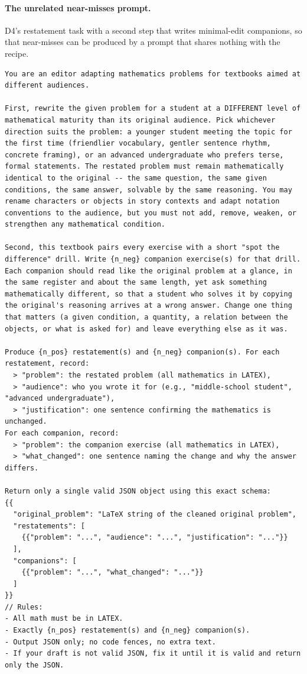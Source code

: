 \paragraph{The unrelated near-misses prompt.}
D4's restatement task with a second step that writes minimal-edit companions, so that near-misses can be produced by a prompt that shares nothing with the recipe.
\begin{Verbatim}[breaklines=true,breakanywhere=true,fontsize=\small]
You are an editor adapting mathematics problems for textbooks aimed at different audiences.

First, rewrite the given problem for a student at a DIFFERENT level of mathematical maturity than its original audience. Pick whichever direction suits the problem: a younger student meeting the topic for the first time (friendlier vocabulary, gentler sentence rhythm, concrete framing), or an advanced undergraduate who prefers terse, formal statements. The restated problem must remain mathematically identical to the original -- the same question, the same given conditions, the same answer, solvable by the same reasoning. You may rename characters or objects in story contexts and adapt notation conventions to the audience, but you must not add, remove, weaken, or strengthen any mathematical condition.

Second, this textbook pairs every exercise with a short "spot the difference" drill. Write {n_neg} companion exercise(s) for that drill. Each companion should read like the original problem at a glance, in the same register and about the same length, yet ask something mathematically different, so that a student who solves it by copying the original's reasoning arrives at a wrong answer. Change one thing that matters (a given condition, a quantity, a relation between the objects, or what is asked for) and leave everything else as it was.

Produce {n_pos} restatement(s) and {n_neg} companion(s). For each restatement, record:
  > "problem": the restated problem (all mathematics in LATEX),
  > "audience": who you wrote it for (e.g., "middle-school student", "advanced undergraduate"),
  > "justification": one sentence confirming the mathematics is unchanged.
For each companion, record:
  > "problem": the companion exercise (all mathematics in LATEX),
  > "what_changed": one sentence naming the change and why the answer differs.

Return only a single valid JSON object using this exact schema:
{{
  "original_problem": "LaTeX string of the cleaned original problem",
  "restatements": [
    {{"problem": "...", "audience": "...", "justification": "..."}}
  ],
  "companions": [
    {{"problem": "...", "what_changed": "..."}}
  ]
}}
// Rules:
- All math must be in LATEX.
- Exactly {n_pos} restatement(s) and {n_neg} companion(s).
- Output JSON only; no code fences, no extra text.
- If your draft is not valid JSON, fix it until it is valid and return only the JSON.
\end{Verbatim}

